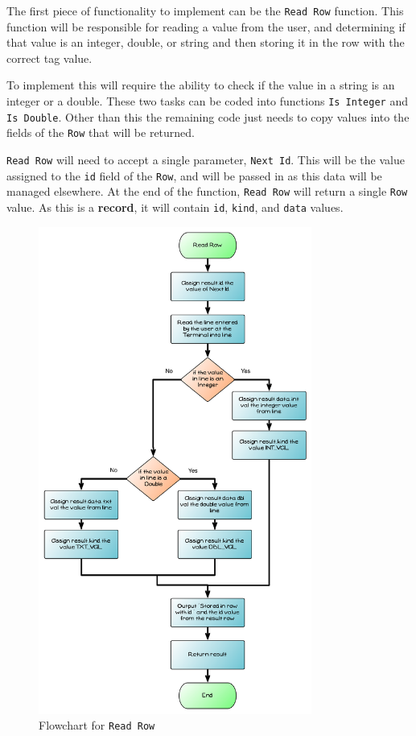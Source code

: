 The first piece of functionality to implement can be the \texttt{Read Row} function. This function will be responsible for reading a value from the user, and determining if that value is an integer, double, or string and then storing it in the row with the correct tag value.

To implement this will require the ability to check if the value in a string is an integer or a double. These two tasks can be coded into functions \texttt{Is Integer} and \texttt{Is Double}. Other than this the remaining code just needs to copy values into the fields of the \texttt{Row} that will be returned.

\texttt{Read Row} will need to accept a single parameter, \texttt{Next Id}. This will be the value assigned to the \texttt{id} field of the \texttt{Row}, and will be passed in as this data will be managed elsewhere. At the end of the function, \texttt{Read Row} will return a single \texttt{Row} value. As this is a \textbf{record}, it will contain \texttt{id}, \texttt{kind}, and \texttt{data} values.

\begin{figure}[p]
   \centering
   \includegraphics[width=0.80\textwidth]{./topics/type-decl/diagrams/ReadRowFlow} 
   \caption{Flowchart for \texttt{Read Row}}
   \label{fig:read-row-flow}
\end{figure}

